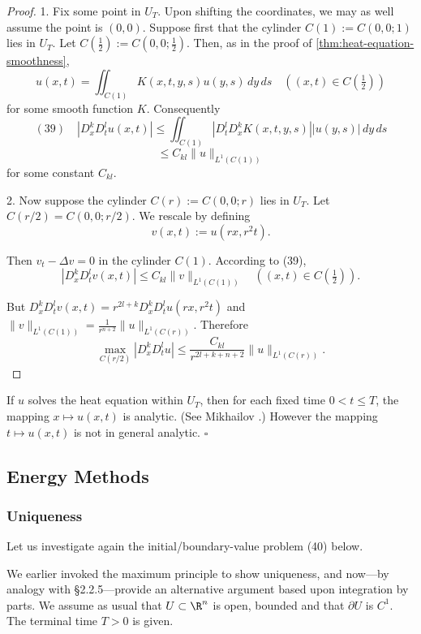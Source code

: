 \begin{proof}
1. Fix some point in $U_T$. Upon shifting the coordinates, we may as well assume the point is $(0,0)$. Suppose first that the cylinder $C(1) := C(0,0;1)$ lies in $U_T$. Let $C\left(\frac{1}{2}\right) := C\left(0,0;\frac{1}{2}\right)$. Then, as in the proof of \cref{thm:heat-equation-smoothness},
$$u(x,t) = \iint_{C(1)} K(x,t,y,s)u(y,s)\,dy\,ds \quad \left((x,t) \in C\left(\tfrac{1}{2}\right)\right)$$
for some smooth function $K$. Consequently
$$(39) \quad |D_x^k D_t^l u(x,t)| \leq \iint_{C(1)} |D_t^l D_x^k K(x,t,y,s)||u(y,s)|\,dy\,ds$$
$$\leq C_{kl}\|u\|_{L^1(C(1))}$$
for some constant $C_{kl}$.

2. Now suppose the cylinder $C(r) := C(0,0;r)$ lies in $U_T$. Let $C(r/2) = C(0,0;r/2)$. We rescale by defining
$$v(x,t) := u(rx,r^2t).$$

Then $v_t - \Delta v = 0$ in the cylinder $C(1)$. According to (39),
$$|D_x^k D_t^l v(x,t)| \leq C_{kl}\|v\|_{L^1(C(1))} \quad ((x,t) \in C(\tfrac12)).$$

But $D_x^k D_t^l v(x,t) = r^{2l+k}D_x^k D_t^l u(rx,r^2t)$ and $\|v\|_{L^1(C(1))} = \frac{1}{r^{n+2}}\|u\|_{L^1(C(r))}$. Therefore
$$\max_{C(r/2)} |D_x^k D_t^l u| \leq \frac{C_{kl}}{r^{2l+k+n+2}}\|u\|_{L^1(C(r))}.$$
\end{proof}

\begin{remark}
\label{rem:heat-equation-spatial-analyticity}
If $u$ solves the heat equation within $U_T$, then for each fixed time $0 < t \leq T$, the mapping $x \mapsto u(x,t)$ is analytic. (See Mikhailov \cite{Mikhailov1978}.) However the mapping $t \mapsto u(x,t)$ is not in general analytic. $\square$
\end{remark}

\subsection{Energy Methods}
\label{sec:heat-energy-methods}

\subsubsection{Uniqueness}
\label{sec:heat-energy-uniqueness}

Let us investigate again the initial/boundary-value problem (40) below.

We earlier invoked the maximum principle to show uniqueness, and now---by analogy with \S2.2.5---provide an alternative argument based upon integration by parts. We assume as usual that $U \subset \R^n$ is open, bounded and that $\partial U$ is $C^1$. The terminal time $T > 0$ is given.

